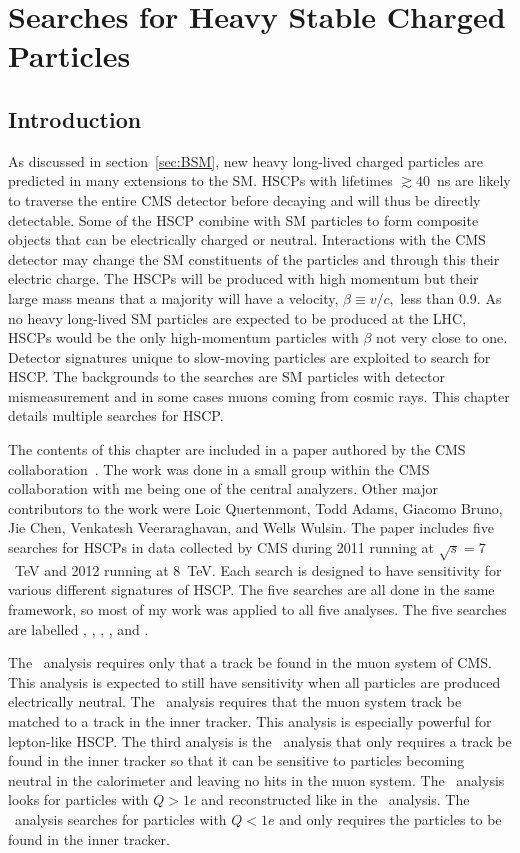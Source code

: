 \chapter{Searches for Heavy Stable Charged Particles \label{sec:search}}

\section{Introduction}
As discussed in section~\ref{sec:BSM}, new heavy long-lived charged particles are predicted in many extensions to the SM. HSCPs with
lifetimes $\gtrsim 40$~ns are likely to traverse the entire CMS detector before decaying and will thus be directly detectable.
Some of the HSCP combine with SM particles to form composite objects that can be electrically charged or neutral.
Interactions with the CMS detector may change the SM constituents of the particles and through this their electric charge.
The HSCPs will be produced with high momentum but their large mass means that
a majority will have a velocity, $\beta \equiv v/c,$ less than 0.9.
As no heavy long-lived SM particles are expected to be produced at the LHC, HSCPs would be the only high-momentum particles with $\beta$ not very close to one.
Detector signatures unique to slow-moving particles are exploited to search for HSCP.
The backgrounds to the searches are SM particles with detector mismeasurement and in some cases
muons coming from cosmic rays. This chapter details multiple searches for HSCP.

The contents of this chapter are included in a paper authored by the CMS collaboration~\cite{Chatrchyan:2013oca}.
The work was done in a small group within the CMS collaboration with me being one of the central analyzers.
Other major contributors to the work were Loic Quertenmont, Todd Adams, Giacomo Bruno, Jie Chen, Venkatesh Veeraraghavan, and Wells Wulsin.
The paper includes five searches for HSCPs in data collected by CMS during 2011 running at $\sqrt{s}=7$~TeV and 2012 running at 8~TeV.
Each search is designed to have sensitivity for various different signatures of HSCP. 
The five searches are all done in the same framework,
so most of my work was applied to all five analyses. The five searches are labelled \muononly, \tktof, \tkonly, \multi, and \fract. 

The \muononly\ analysis requires only that a track be found in the muon system of CMS.
This analysis is expected to still have sensitivity when all particles are produced electrically neutral. The
\tktof\ analysis requires that the muon system track be matched to a track in the inner tracker. This analysis is especially
powerful for lepton-like HSCP. The third analysis is the \tkonly\ analysis that only requires a track be found in the inner tracker so that it can be sensitive to particles
becoming neutral in the calorimeter and leaving no hits in the muon system. The \multi\ analysis looks 
for particles with $Q > 1e$ and reconstructed like in the \tktof\ analysis. The \fract\ analysis searches for particles with $Q < 1e$ and only
requires the particles to be found in the inner tracker.

